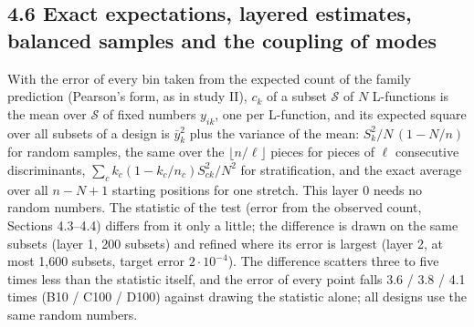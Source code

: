 \documentclass[
  10pt,
]{article}
\begin{document}
\hypertarget{exact-expectations-layered-estimates-balanced-samples-and-the-coupling-of-modes}{%
\subsection{4.6 Exact expectations, layered estimates, balanced samples
and the coupling of
modes}\label{exact-expectations-layered-estimates-balanced-samples-and-the-coupling-of-modes}}

With the error of every bin taken from the expected count of the family
prediction (Pearson's form, as in study II), \(c_k\) of a subset
\(\mathcal S\) of \(N\) L-functions is the mean over \(\mathcal S\) of
fixed numbers \(y_{ik}\), one per L-function, and its expected square
over all subsets of a design is \(\bar y_k^2\) plus the variance of the
mean: \(S_k^2/N\,(1 - N/n)\) for random samples, the same over the
\(\lfloor n/\ell\rfloor\) pieces for pieces of \(\ell\) consecutive
discriminants, \(\sum_c k_c(1 - k_c/n_c)S_{ck}^2/N^2\) for
stratification, and the exact average over all \(n - N + 1\) starting
positions for one stretch. This layer 0 needs no random numbers. The
statistic of the test (error from the observed count, Sections 4.3--4.4)
differs from it only a little; the difference is drawn on the same
subsets (layer 1, 200 subsets) and refined where its error is largest
(layer 2, at most 1,600 subsets, target error \(2\cdot10^{-4}\)). The
difference scatters three to five times less than the statistic itself,
and the error of every point falls 3.6 / 3.8 / 4.1 times (B10 / C100 /
D100) against drawing the statistic alone; all designs use the same
random numbers.
\end{document}
